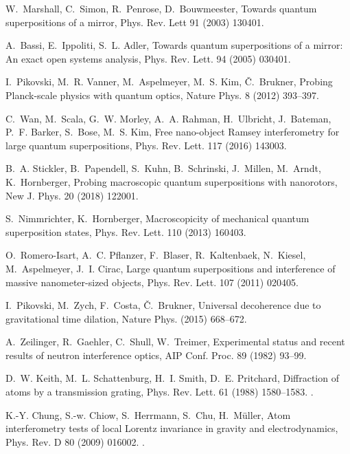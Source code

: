\documentclass[3p,sort&compress,12pt]{elsarticle}
\begin{document}
\begin{thebibliography}{100}
W.~Marshall, C.~Simon, R.~Penrose, D.~Bouwmeester, Towards quantum
  superpositions of a mirror, Phys. Rev. Lett 91 (2003) 130401.

A.~Bassi, E.~Ippoliti, S.~L. Adler, Towards quantum superpositions of a mirror:
  An exact open systems analysis, Phys. Rev. Lett. 94 (2005) 030401.

I.~Pikovski, M.~R. Vanner, M.~Aspelmeyer, M.~S. Kim, {\v C}.~Brukner, Probing
  {P}lanck-scale physics with quantum optics, Nature Phys. 8 (2012) 393--397.

C.~Wan, M.~Scala, G.~W. Morley, A.~A. Rahman, H.~Ulbricht, J.~Bateman, P.~F.
  Barker, S.~Bose, M.~S. Kim, Free nano-object {R}amsey interferometry for
  large quantum superpositions, Phys. Rev. Lett. 117 (2016) 143003.

B.~A. Stickler, B.~Papendell, S.~Kuhn, B.~Schrinski, J.~Millen, M.~Arndt,
  K.~Hornberger, Probing macroscopic quantum superpositions with nanorotors,
  New J. Phys. 20 (2018) 122001.

S.~Nimmrichter, K.~Hornberger, Macroscopicity of mechanical quantum
  superposition states, Phys. Rev. Lett. 110 (2013) 160403.

O.~Romero-Isart, A.~C. Pflanzer, F.~Blaser, R.~Kaltenbaek, N.~Kiesel,
  M.~Aspelmeyer, J.~I. Cirac, Large quantum superpositions and interference of
  massive nanometer-sized objects, Phys. Rev. Lett. 107 (2011) 020405.

I.~Pikovski, M.~Zych, F.~Costa, {\v C}.~Brukner, Universal decoherence due to
  gravitational time dilation, Nature Phys. (2015) 668--672.

A.~Zeilinger, R.~Gaehler, C.~Shull, W.~Treimer, Experimental status and recent
  results of neutron interference optics, AIP Conf. Proc. 89 (1982) 93--99.

D.~W. Keith, M.~L. Schattenburg, H.~I. Smith, D.~E. Pritchard, Diffraction of
  atoms by a transmission grating, Phys. Rev. Lett. 61 (1988) 1580--1583.
\newblock \href {http://dx.doi.org/10.1103/PhysRevLett.61.1580}
  {}.

K.-Y. Chung, S.-w. Chiow, S.~Herrmann, S.~Chu, H.~M\"uller, Atom interferometry
  tests of local {L}orentz invariance in gravity and electrodynamics, Phys.
  Rev. D 80 (2009) 016002.
\newblock \href {http://dx.doi.org/10.1103/PhysRevD.80.016002}
  {}.


\end{thebibliography}
\end{document}
